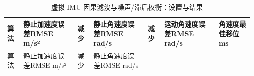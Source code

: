 \FloatBarrier\begingroup\small\setlength{\tabcolsep}{2.5pt}
\begin{longtable}[]{@{}
  >{\raggedright\arraybackslash}p{}
  >{\raggedleft\arraybackslash}p{}
  >{\raggedleft\arraybackslash}p{}
  >{\raggedleft\arraybackslash}p{}
  >{\raggedleft\arraybackslash}p{}
  >{\raggedleft\arraybackslash}p{}
  >{\raggedleft\arraybackslash}p{}@{}}
\caption{虚拟 IMU 因果滤波与噪声/滞后权衡：设置与结果}\label{tab:s06-1}\tabularnewline
\toprule\noalign{}
\begin{minipage}[b]{\linewidth}\raggedright
算法
\end{minipage} & \begin{minipage}[b]{\linewidth}\raggedleft
静止加速度误差RMSE m/s²
\end{minipage} & \begin{minipage}[b]{\linewidth}\raggedleft
减少
\end{minipage} & \begin{minipage}[b]{\linewidth}\raggedleft
静止角速度误差RMSE rad/s
\end{minipage} & \begin{minipage}[b]{\linewidth}\raggedleft
减少
\end{minipage} & \begin{minipage}[b]{\linewidth}\raggedleft
运动角速度误差RMSE rad/s
\end{minipage} & \begin{minipage}[b]{\linewidth}\raggedleft
角速度最佳移位 ms
\end{minipage} \\
\midrule\noalign{}
\endfirsthead
\toprule\noalign{}
\begin{minipage}[b]{\linewidth}\raggedright
算法
\end{minipage} & \begin{minipage}[b]{\linewidth}\raggedleft
静止加速度误差RMSE m/s²
\end{minipage} & \begin{minipage}[b]{\linewidth}\raggedleft
减少
\end{minipage} & \begin{minipage}[b]{\linewidth}\raggedleft
静止角速度误差RMSE rad/s
\end{minipage} & \begin{minipage}[b]{\linewidth}\raggedleft

\end{minipage}
\end{longtable}

